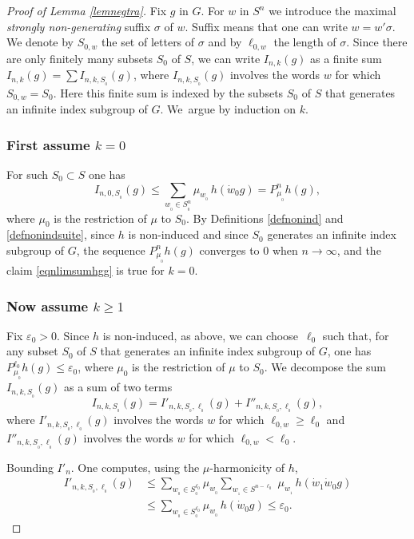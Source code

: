 \documentclass[JEP,XML,SOM,Unicode]{cedram}
\theoremstyle{definition}
\let\eps\varepsilon
\let\si\sigma
\let\ra\to
\begin{document}
\begin{proof}[Proof of Lemma \ref{lemnegtra}]
Fix $g$ in $G$. For $w$ in $S^n$ we introduce
the maximal \emph{strongly non-generating} suffix $\si$ of $w$.
Suffix means that one can write $w=w'\si$.
We denote by $S_{0,w}$ the set of letters of $\si$ and
by $\ell_{0,w}$ the length of $\si$.
Since there are only finitely many subsets $S_0$ of $S$,
we can write $I_{n,k}(g)$
as a finite sum $I_{n,k}(g)=\sum I_{n,k,S_{_0}}(g)$,
where $I_{n,k,S_{_0}}(g)$ involves the words $w$ for which $S_{0,w}=S_0$.
Here this finite sum is indexed by the subsets $S_0$ of $S$ that generates an infinite index subgroup of $G$.
We~argue by induction on $k$.

\subsubsection*{First assume $k=0$}
For such $S_0\subset S$
one has
\[
I_{n,0,S_{_0}}(g)\leq
\sum_{w_{_0}\in S_{_0}^{n}}\mu_{w_{_0}}\, h(\dot{w}_0g)
=
P_{\mu_{_0}}^nh(g),
\]
where $\mu_0$ is the
restriction of $\mu$ to $S_0$.
By Definitions \ref{defnonind} and \ref{defnonindsuite}, since $h$ is non-induced
and since $S_0$ generates an infinite index subgroup of $G$, the sequence
$P_{\mu_{_0}}^nh(g)$ converges to $0$ when $n\ra \infty$,
and the claim \eqref{eqnlimsumhgg} is true for $k=0$.

\subsubsection*{Now assume $k\geq 1$}
Fix $\eps_0>0$.
Since $h$ is non-induced, as above, we can choose~$\ell_0$ such that,
for any subset $S_0$ of $S$ that generates an infinite index subgroup of $G$,
one has $P_{\mu_{_0}}^{\ell_0}h(g)\leq \eps_0$, where $\mu_0$ is the
restriction of $\mu$ to $S_0$.
We decompose the sum $I_{n,k,S_{_0}}(g)$ as a sum of two terms
\[
I_{n,k,S_{_0}}(g)=
I'_{n,k,S_{_0},\ell_{_0}}(g)+I''_{n,k,S_{_0},\ell_{_0}}(g),
\]
where
$I'_{n,k,S_{_0},\ell_{_0}}(g)$ involves the words $w$ for which $\ell_{0,w}\geq \ell_0$ and
$I''_{n,k,S_{_0},\ell_{_0}}(g)$
involves the words $w$ for which $\ell_{0,w}< \ell_0$.

Bounding $I'_n$. One computes, using the $\mu$-harmonicity of $h$,
\begin{align*}
I'_{n,k,S_{_0},\ell_{_0}}(g)&\leq
\sum_{w_{_0}\in S_{_0}^{\ell_0}}\mu_{w_{_0}}
\sum_{w_{_1}\in S^{n\!-\!\ell_0}}\,
\mu_{w_{_1}}\, h(\dot{w}_{1}\dot{w}_0g)\\
&\leq
\sum_{w_{_0}\in S_{_0}^{\ell_0}}\mu_{w_{_0}}\, h(\dot{w}_0g)\leq \eps_0.
\end{align*}


\end{proof}
\end{document}
